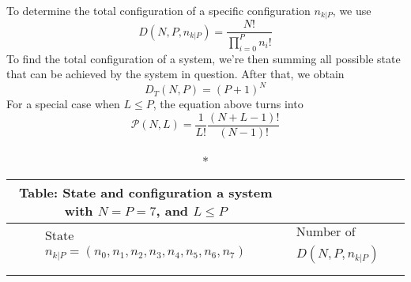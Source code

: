 \documentclass[../../../Main.tex]{subfiles}
\begin{document}
To determine the total configuration of a specific configuration $n_{k|P}$, we use
\begin{equation*}
    D(N,P,n_{k|P})=\frac{N!}{\displaystyle\prod_{i=0}^{P}n_i!}
\end{equation*}
To find the total configuration of a system, we're then summing all possible state that can be achieved by the system in question. After that, we obtain
\begin{equation*}
    D_T(N,P)=(P+1)^N
\end{equation*}
For a special case when $L\leq P$, the equation above turns into
\begin{equation*}
\mathcal{P}(N,L)=\frac{1}{L!}\frac{(N+L-1)!}{(N-1)!}
\end{equation*}

\begin{longtable}{c||c}
    \caption*{Table: State and configuration a system with $N=P=7$}, and $L\leq P$\\
    \hline\hline
    $\begin{array}{c}\text{State} \\n_{k|P}=(n_0,n_1,n_2, n_3, n_4, n_5, n_6, n_7)\end{array}$&$\begin{array}{c}\text{Number of configuration}\\  D(N,P,n_{k|P})\end{array}$\\ 
    \hline\hline\\


\end{longtable}
\end{document}

